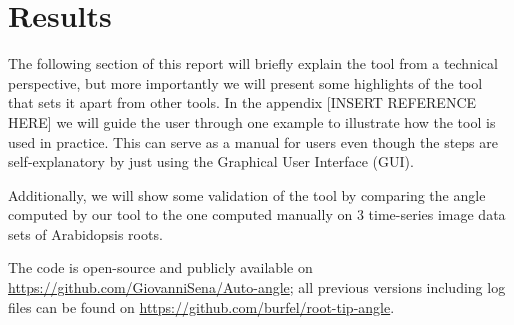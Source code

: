 
\chapter{Results} %

\label{results} %

%





The following section of this report will briefly explain the tool from a technical perspective, but more importantly  %
we will present some highlights of the tool that sets it apart from other tools. In the appendix [INSERT REFERENCE HERE] we will guide the user through one example to illustrate how the tool is used in practice. This can serve as a manual for users even though the steps are self-explanatory by just using the Graphical User Interface (GUI). 

Additionally, we will show some validation of the tool by comparing the angle computed by our tool to the one computed manually on 3 time-series image data sets of Arabidopsis roots.

The code is open-source and publicly available on \url{https://github.com/GiovanniSena/Auto-angle}; all previous versions including log files can be found on \url{https://github.com/burfel/root-tip-angle}.


%
%



